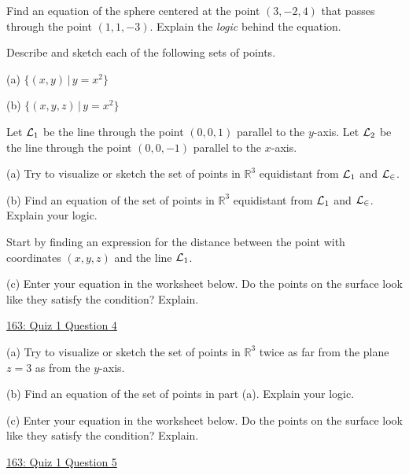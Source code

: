 \documentclass{ximera}
\begin{document}
\begin{question}  \label{Q:9df33334}
Find an equation of the sphere centered at the point $(3,-2,4)$ that passes through the point $(1,1,-3)$. Explain the \emph{logic} behind the equation.
\end{question}

\begin{question}  \label{Q44435313}
Describe and sketch each of the following sets of points.

(a) $\{ (x,y) \, | \, y=x^2 \}$

(b) $\{ (x,y,z) \, | \, y=x^2 \}$
\end{question}


\begin{question}  \label{Qpo8873032}
Let ${\cal L}_1$ be the line through the point $(0,0,1)$ parallel to the $y$-axis. Let ${\cal L}_2$ be the line through the point $(0,0,-1)$ parallel to the $x$-axis.

(a) Try to visualize or sketch the set of points in $\mathbb{R}^3$ equidistant from ${\cal L}_1$ and ${\cal L_2}$.

(b) Find an equation of the set of points in $\mathbb{R}^3$ equidistant from ${\cal L}_1$ and ${\cal L_2}$. Explain your logic.

\begin{hint}
Start by finding an expression for the distance between the point with coordinates $(x,y,z)$ and the line ${\cal L}_1$.
\end{hint}

(c) Enter  your equation in the worksheet below. Do the points on the surface look like they satisfy the condition? Explain.

\begin{onlineOnly}
    \begin{center}
\end{center}
\end{onlineOnly}

\href{https://www.desmos.com/3d/pzksnds2pe}{163: Quiz 1 Question 4}


\end{question}

\begin{question}  \label{Qpdfdsfe032}
(a) Try to visualize or sketch the set of points in $\mathbb{R}^3$  twice as far from the plane $z=3$ as from the $y$-axis. 

(b) Find an equation of the set of points in part (a). Explain your logic.

(c) Enter  your equation in the worksheet below. Do the points on the surface look like they satisfy the condition? Explain.

\begin{onlineOnly}
    \begin{center}
\end{center}
\end{onlineOnly}

\href{https://www.desmos.com/3d/qvin80o05t}{163: Quiz 1 Question 5}
\end{question}
\end{document}
